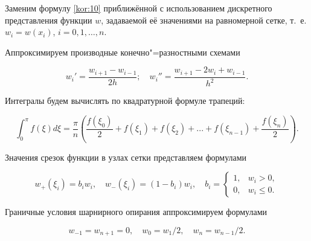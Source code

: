 Заменим формулу \eqref{kor:10} приближённой с использованием дискретного представления функции $w$, задаваемой её значениями на равномерной сетке, т.~е. $w_i = w(x_i)$, $i=0, 1, \dots, n$.



Аппроксимируем производные конечно"=разностными схемами

\begin{equation}

w_i' = \frac{w_{i+1} - w_{i-1}}{2h}; \quad 

w_i'' = \frac{w_{i+1} - 2w_i + w_{i-1}}{h^2}.

\label{kor:11}

\end{equation}

Интегралы будем вычислять по квадратурной формуле трапеций:

\begin{equation}

\int_0^\pi f(\xi)  d\xi = \frac{\pi}{n} \left( \frac{f(\xi_0)}{2}+f(\xi_1)+f(\xi_2)+...+f(\xi_{n-1})+\frac{f(\xi_n)}{2}  \right).

\label{kor:12}

\end{equation}

Значения срезок функции в узлах сетки представляем формулами

\begin{equation}

w_+(\xi_i)=b_i w_i, \quad  w_-(\xi_i)=(1-b_i) w_i, \quad  

b_i=\left\{

\begin{array}{ll} 1, & w_i>0,

\\ 0, & w_i\le0.

\end{array}

\right.

\label{kor:13}

\end{equation}

Граничные условия шарнирного опирания аппроксимируем формулами

\begin{equation}

w_{-1}=w_{n+1}=0, \quad  w_{0}=w_{1}/2, \quad  w_{n}=w_{n-1}/2.

\label{kor:14}

\end{equation}



